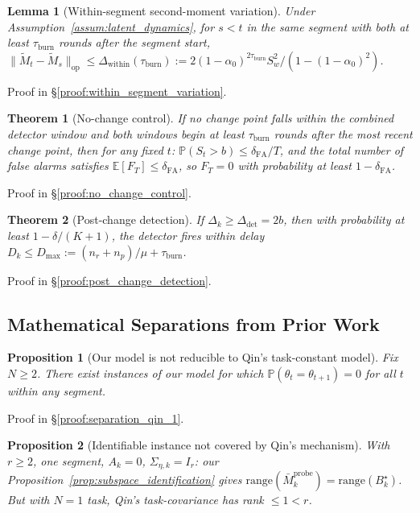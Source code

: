 \documentclass{article}
\newcommand{\E}{\mathbb{E}}
\newcommand{\Prob}{\mathbb{P}}
\newcommand{\op}{\mathrm{op}}
\newcommand{\range}{\mathrm{range}}
\newtheorem{lemma}{Lemma}
\newtheorem{theorem}{Theorem}
\newtheorem{proposition}{Proposition}
\begin{document}
\begin{lemma}[Within-segment second-moment variation]
\label{lem:within_segment_variation}
Under Assumption~\ref{assum:latent_dynamics}, for $s < t$ in the same segment with both at least $\tau_{\mathrm{burn}}$ rounds after the segment start,
$\|\widetilde M_t - \widetilde M_s\|_{\op} \le \Delta_{\mathrm{within}}(\tau_{\mathrm{burn}}) := 2(1-\alpha_0)^{2\tau_{\mathrm{burn}}} S_w^2/(1-(1-\alpha_0)^2)$.
\end{lemma}

Proof in \S\ref{proof:within_segment_variation}.

\begin{theorem}[No-change control]
\label{thm:no_change_control}
If no change point falls within the combined detector window and both windows begin at least $\tau_{\mathrm{burn}}$ rounds after the most recent change point, then for any fixed $t$:
$\Prob(S_t > b) \le \delta_{\mathrm{FA}}/T$,
and the total number of false alarms satisfies $\E[F_T] \le \delta_{\mathrm{FA}}$, so $F_T = 0$ with probability at least $1 - \delta_{\mathrm{FA}}$.
\end{theorem}

Proof in \S\ref{proof:no_change_control}.

\begin{theorem}[Post-change detection]
\label{thm:post_change_detection}
If $\Delta_k \ge \Delta_{\mathrm{det}} = 2b$, then with probability at least $1 - \delta/(K+1)$, the detector fires within delay $D_k \le D_{\max} := (n_r + n_p)/\mu + \tau_{\mathrm{burn}}$.
\end{theorem}

Proof in \S\ref{proof:post_change_detection}.

\subsection{Mathematical Separations from Prior Work}
\label{app:separation}

\begin{proposition}[Our model is not reducible to Qin's task-constant model]
\label{prop:separation_qin_1}
Fix $N\ge 2$. There exist instances of our model for which $\Prob(\theta_t = \theta_{t+1}) = 0$ for all $t$ within any segment.
\end{proposition}

Proof in \S\ref{proof:separation_qin_1}.

\begin{proposition}[Identifiable instance not covered by Qin's mechanism]
\label{prop:separation_qin_2}
With $r\ge 2$, one segment, $A_k = 0$, $\Sigma_{\eta,k} = I_r$: our Proposition~\ref{prop:subspace_identification} gives $\range(\bar M_k^{\mathrm{probe}})=\range(B_k^\star)$.
But with $N=1$ task, Qin's task-covariance has rank $\le 1 < r$.
\end{proposition}
\end{document}
